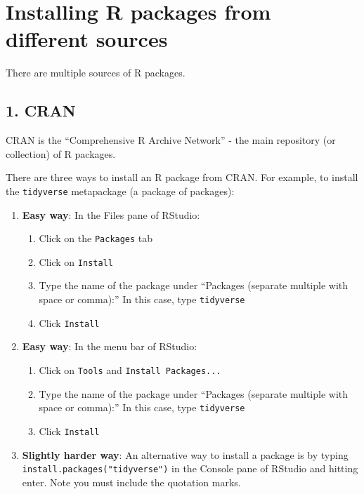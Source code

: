 \documentclass[]{book}
\providecommand{\tightlist}{%
  \setlength{\itemsep}{0pt}\setlength{\parskip}{0pt}}
\begin{document}
\hypertarget{installing-r-packages-from-different-sources}{%
\section{Installing R packages from different sources}\label{installing-r-packages-from-different-sources}}

There are multiple sources of R packages.

\hypertarget{cran}{%
\subsection*{1. CRAN}\label{cran}}

CRAN is the ``Comprehensive R Archive Network'' - the main repository (or collection) of R packages.

There are three ways to install an R package from CRAN. For example, to install the \texttt{tidyverse} metapackage (a package of packages):

\begin{enumerate}
\def\labelenumi{\arabic{enumi}.}
\tightlist
\item
  \textbf{Easy way}: In the Files pane of RStudio:

  \begin{enumerate}
  \def\labelenumii{\alph{enumii}.}
  \tightlist
  \item
    Click on the \texttt{Packages} tab
  \item
    Click on \texttt{Install}
  \item
    Type the name of the package under ``Packages (separate multiple with space or comma):'' In this case, type \texttt{tidyverse}
  \item
    Click \texttt{Install}
  \end{enumerate}
\item
  \textbf{Easy way}: In the menu bar of RStudio:

  \begin{enumerate}
  \def\labelenumii{\alph{enumii}.}
  \tightlist
  \item
    Click on \texttt{Tools} and \texttt{Install\ Packages...}
  \item
    Type the name of the package under ``Packages (separate multiple with space or comma):'' In this case, type \texttt{tidyverse}
  \item
    Click \texttt{Install}
  \end{enumerate}
\item
  \textbf{Slightly harder way}: An alternative way to install a package is by typing \texttt{install.packages("tidyverse")} in the Console pane of RStudio and hitting enter. Note you must include the quotation marks.
\end{enumerate}
\end{document}
